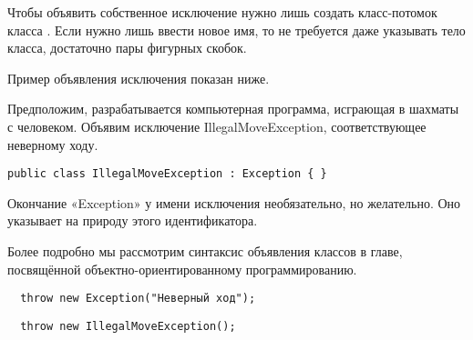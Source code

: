 

Чтобы объявить собственное исключение нужно лишь создать класс-потомок
класса . Если нужно лишь ввести новое имя, то не требуется
даже указывать тело класса, достаточно пары фигурных скобок.

Пример объявления исключения показан ниже.

\begin{example}
Предположим, разрабатывается компьютерная программа, исграющая в
шахматы с человеком. Объявим исключение IllegalMoveException,
соответствующее неверному ходу.

\begin{lstlisting}
public class IllegalMoveException : Exception { }
\end{lstlisting}
\end{example}

Окончание «Exception» у имени исключения необязательно, но
желательно. Оно указывает на природу этого идентификатора.

Более подробно мы рассмотрим синтаксис объявления классов в главе,
посвящённой объектно-ориентированному программированию.


\begin{lstlisting}
  throw new Exception("Неверный ход");
\end{lstlisting}



\begin{lstlisting}
  throw new IllegalMoveException();
\end{lstlisting}



